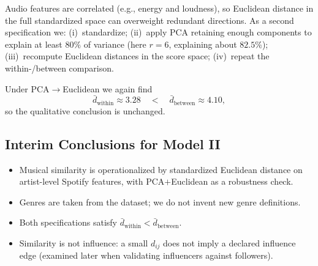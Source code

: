 Audio features are correlated (e.g., energy and loudness), so Euclidean distance in the full standardized space can overweight redundant directions. As a second specification we: (i)~standardize; (ii)~apply PCA retaining enough components to explain at least $80\%$ of variance (here $r=6$, explaining about $82.5\%$); (iii)~recompute Euclidean distances in the score space; (iv)~repeat the within-/between comparison.

Under PCA$\to$Euclidean we again find
\[
\bar{d}_{\mathrm{within}} \approx 3.28
\quad < \quad
\bar{d}_{\mathrm{between}} \approx 4.10,
\]
so the qualitative conclusion is unchanged.

\subsection{Interim Conclusions for Model II}
\begin{itemize}
  \item Musical similarity is operationalized by standardized Euclidean distance on artist-level Spotify features, with PCA$+$Euclidean as a robustness check.
  \item Genres are taken from the dataset; we do not invent new genre definitions.
  \item Both specifications satisfy $\bar{d}_{\mathrm{within}}<\bar{d}_{\mathrm{between}}$.
  \item Similarity is not influence: a small $d_{ij}$ does not imply a declared influence edge (examined later when validating influencers against followers).
\end{itemize}
